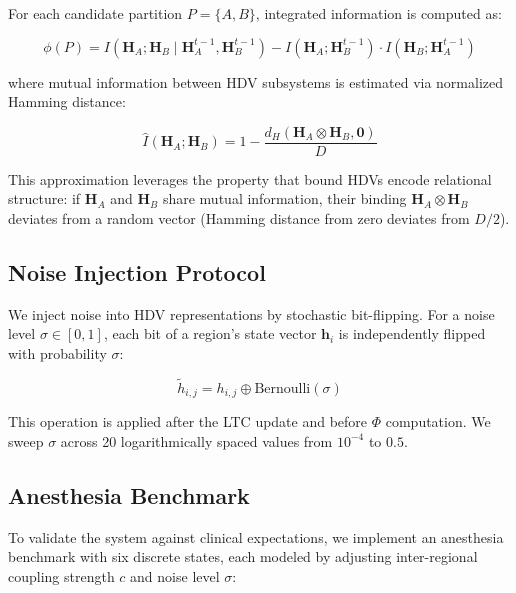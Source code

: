 \documentclass[12pt,a4paper]{article}
\begin{document}
For each candidate partition $P = \{A, B\}$, integrated information is computed as:

\begin{equation}
\phi(P) = I(\mathbf{H}_A; \mathbf{H}_B \mid \mathbf{H}_A^{t-1}, \mathbf{H}_B^{t-1}) - I(\mathbf{H}_A; \mathbf{H}_B^{t-1}) \cdot I(\mathbf{H}_B; \mathbf{H}_A^{t-1})
\end{equation}

where mutual information between HDV subsystems is estimated via normalized Hamming distance:

\begin{equation}
\hat{I}(\mathbf{H}_A; \mathbf{H}_B) = 1 - \frac{d_H(\mathbf{H}_A \otimes \mathbf{H}_B, \mathbf{0})}{D}
\end{equation}

This approximation leverages the property that bound HDVs encode relational structure: if $\mathbf{H}_A$ and $\mathbf{H}_B$ share mutual information, their binding $\mathbf{H}_A \otimes \mathbf{H}_B$ deviates from a random vector (Hamming distance from zero deviates from $D/2$).

\subsection{Noise Injection Protocol}

We inject noise into HDV representations by stochastic bit-flipping. For a noise level $\sigma \in [0, 1]$, each bit of a region's state vector $\mathbf{h}_i$ is independently flipped with probability $\sigma$:

\begin{equation}
\tilde{h}_{i,j} = h_{i,j} \oplus \text{Bernoulli}(\sigma)
\end{equation}

This operation is applied after the LTC update and before $\Phi$ computation. We sweep $\sigma$ across 20 logarithmically spaced values from $10^{-4}$ to $0.5$.

\subsection{Anesthesia Benchmark}

To validate the system against clinical expectations, we implement an anesthesia benchmark with six discrete states, each modeled by adjusting inter-regional coupling strength $c$ and noise level $\sigma$:
\end{document}
